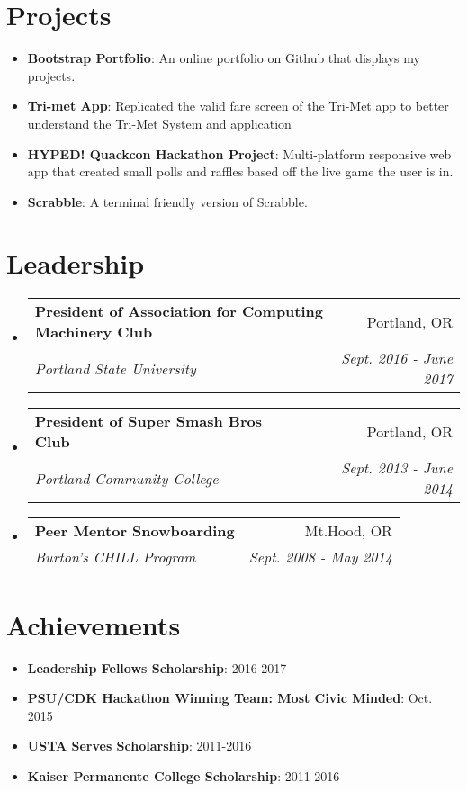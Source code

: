 \documentclass[letterpaper,11pt]{article}
\makeatletter
\newcommand{\resumeItem}[2]{
  \item\small{
    \textbf{#1}{: #2 \vspace{-2pt}}
  }
}
\newcommand{\resumeSubheading}[4]{
  \vspace{-1pt}\item
    \begin{tabular*}{0.97\textwidth}{l@{\extracolsep{\fill}}r}
      \textbf{#1} & #2 \\
      \textit{\small#3} & \textit{\small #4} \\
    \end{tabular*}\vspace{-5pt}
}
\newcommand{\resumeSubItem}[2]{\resumeItem{#1}{#2}\vspace{-4pt}}
\newcommand{\resumeSubHeadingListStart}{\begin{itemize}[leftmargin=*]}
\newcommand{\resumeSubHeadingListEnd}{\end{itemize}}
\makeatother
\begin{document}
\section{Projects}
  \resumeSubHeadingListStart
    \resumeSubItem{Bootstrap Portfolio}
        {An online portfolio on Github that displays my projects.}
    \resumeSubItem{Tri-met App}
        {Replicated the valid fare screen of the Tri-Met app to better understand the Tri-Met System and application}
    \resumeSubItem{HYPED! Quackcon Hackathon Project}
         {Multi-platform responsive web app that created small polls and raffles based off the live game the user is in.}
    \resumeSubItem{Scrabble}
        {A terminal friendly version of Scrabble.}
  \resumeSubHeadingListEnd

\section{Leadership}
    \resumeSubHeadingListStart
    
        \resumeSubheading{President of Association for Computing Machinery Club}{Portland, OR}
        {Portland State University}{Sept. 2016 - June 2017}

        \resumeSubheading{President of Super Smash Bros Club}{Portland, OR}
        {Portland Community College}{Sept. 2013 - June 2014}

        \resumeSubheading{Peer Mentor Snowboarding}{Mt.Hood, OR}
        {Burton's CHILL Program}{Sept. 2008 - May 2014}
    
    \resumeSubHeadingListEnd
    
\section{Achievements}
    \resumeSubHeadingListStart
        \resumeItem{Leadership Fellows Scholarship}{2016-2017}
        \resumeItem{PSU/CDK Hackathon Winning Team: Most Civic Minded}{Oct. 2015}
        \resumeItem{USTA Serves Scholarship}{2011-2016}
        \resumeItem{Kaiser Permanente College Scholarship}{2011-2016}
    \resumeSubHeadingListEnd
\end{document}
